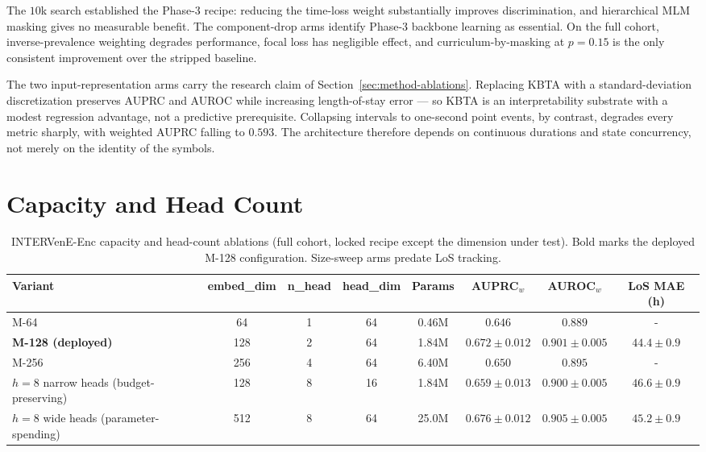 The $10$k search established the Phase-3 recipe: reducing the time-loss weight substantially improves discrimination, and hierarchical MLM masking gives no measurable benefit. The component-drop arms identify Phase-3 backbone learning as essential. On the full cohort, inverse-prevalence weighting degrades performance, focal loss has negligible effect, and curriculum-by-masking at $p{=}0.15$ is the only consistent improvement over the stripped baseline.

The two input-representation arms carry the research claim of Section~\ref{sec:method-ablations}. Replacing KBTA with a standard-deviation discretization preserves AUPRC and AUROC while increasing length-of-stay error --- so KBTA is an interpretability substrate with a modest regression advantage, not a predictive prerequisite. Collapsing intervals to one-second point events, by contrast, degrades every metric sharply, with weighted AUPRC falling to $0.593$. The architecture therefore depends on continuous durations and state concurrency, not merely on the identity of the symbols.

\section{Capacity and Head Count}
\label{app:abl-capacity}

\begin{table}[htbp]
\caption{INTERVenE-Enc capacity and head-count ablations (full cohort, locked recipe except the dimension under test). Bold marks the deployed M-128 configuration. Size-sweep arms predate LoS tracking.}
\label{tab:abl-enc-capacity}
\centering
\singlespacing
\small
\setlength{\tabcolsep}{4pt}
\begin{tabular}{lccccccc}
\toprule
Variant & embed\_dim & n\_head & head\_dim & Params & AUPRC$_w$ & AUROC$_w$ & LoS MAE (h) \\
\midrule
M-64                                  & 64   & 1 & 64 & 0.46M & $0.646$                    & $0.889$                    & -                       \\
\textbf{M-128 (deployed)}             & 128  & 2 & 64 & 1.84M & $\mathbf{0.672 \pm 0.012}$ & $\mathbf{0.901 \pm 0.005}$ & $\mathbf{44.4 \pm 0.9}$ \\
M-256                                 & 256  & 4 & 64 & 6.40M & $0.650$                    & $0.895$                    & -                       \\
\midrule
$h{=}8$ narrow heads (budget-preserving) & 128  & 8 & 16 & 1.84M & $0.659 \pm 0.013$       & $0.900 \pm 0.005$          & $46.6 \pm 0.9$          \\
$h{=}8$ wide heads (parameter-spending)  & 512  & 8 & 64 & 25.0M & $0.676 \pm 0.012$       & $0.905 \pm 0.005$          & $45.2 \pm 0.9$          \\
\bottomrule
\end{tabular}
\end{table}

